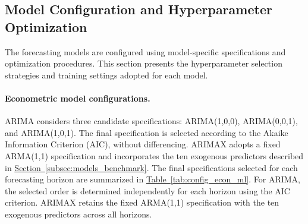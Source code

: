 \documentclass[runningheads,orivec]{llncs}
\begin{document}
\subsection{Model Configuration and Hyperparameter Optimization}\label{subsec:model_config}

The forecasting models are configured using model-specific specifications and optimization procedures. This section presents the hyperparameter selection strategies and training settings adopted for each model.

\paragraph{Econometric model configurations.} ARIMA considers three candidate specifications: ARIMA(1,0,0), ARIMA(0,0,1), and ARIMA(1,0,1). The final specification is selected according to the Akaike Information Criterion (AIC), without differencing. ARIMAX adopts a fixed ARMA(1,1) specification and incorporates the ten exogenous predictors described in \hyperref[subsec:models_benchmark]{Section~\ref*{subsec:models_benchmark}}. The final specifications selected for each forecasting horizon are summarized in \hyperref[tab:config_econ_ml]{Table~\ref*{tab:config_econ_ml}}. For ARIMA, the selected order is determined independently for each horizon using the AIC criterion. ARIMAX retains the fixed ARMA(1,1) specification with the ten exogenous predictors across all horizons.
\end{document}
